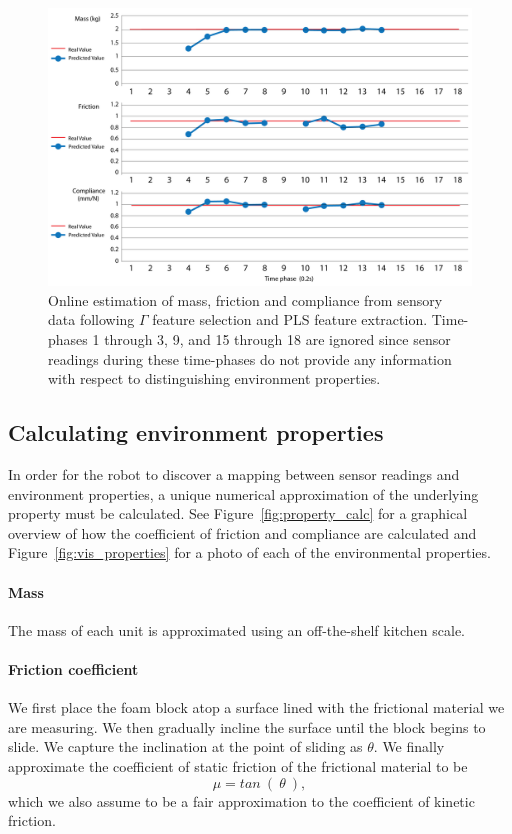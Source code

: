 \begin{figure}[]
	\centering
	\includegraphics[width=\linewidth]{images/online_mfc_vid}
	\caption{Online estimation of mass, friction and compliance from sensory data following $\Gamma$ feature selection and PLS feature extraction. Time-phases 1 through 3, 9, and 15 through 18 are ignored since sensor readings during these time-phases do not provide any information with respect to distinguishing environment properties.}
	\label{fig:online_mfc_vid}
\end{figure}

\subsection{Calculating environment properties}
\label{sec:property_calc_}
In order for the robot to discover a mapping between sensor readings and environment properties, a unique numerical approximation of the underlying property must be calculated.
See Figure~\ref{fig:property_calc} for a graphical overview of how the coefficient of friction and compliance are calculated and Figure~\ref{fig:vis_properties} for a photo of each of the environmental properties.

\paragraph{Mass} 
The mass of each unit is approximated using an off-the-shelf kitchen scale.

\paragraph{Friction coefficient}
We first place the foam block atop a surface lined with the frictional material we are measuring. 
We then gradually incline the surface until the block begins to slide.
We capture the inclination at the point of sliding as $\theta$.
We finally approximate the coefficient of static friction of the frictional material to be 
$$
\mu = tan~(~\theta~), 
$$
which we also assume to be a fair approximation to the coefficient of kinetic friction.

